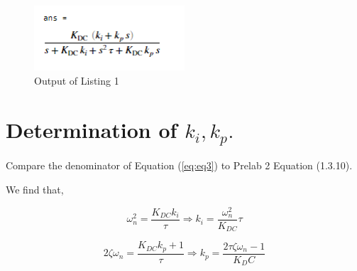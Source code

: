 \documentclass[12pt]{article}
\numberwithin{equation}{section}
\begin{document}
  

  \begin{figure}
    \centering
    \includegraphics[width=0.5\textwidth]{figures/answer}
    \caption{Output of Listing 1}
    \label{fig:fig1}
  \end{figure}

  \newpage

  \section{Determination of $ k_i, k_p. $}

  Compare the denominator of Equation (\ref{eq:eq3}) to Prelab 2 Equation (1.3.10).

  We find that,

  \begin{equation}
    \omega_n^2 = \frac{K_{DC}k_i}{\tau} \Rightarrow k_i = \frac{\omega_n^2}{K_{DC}}\tau
  \end{equation}

  \begin{equation}
    2\zeta\omega_n = \frac{K_{DC}k_p + 1}{\tau} \Rightarrow k_p = \frac{2\tau\zeta\omega_n - 1}{K_DC}
  \end{equation}
\end{document}
